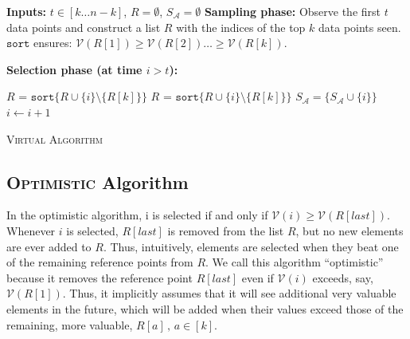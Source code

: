 \begin{algorithm}[ht]
\textbf{Inputs:} $t\in[k\dots n-k]$, $R = \emptyset$, $S_{\mathcal{A}} = \emptyset$
\newline
\textbf{Sampling phase:} Observe the first $t$ data points and construct a list $R$ with the indices of the top $k$ data points seen.  $\texttt{sort}$ ensures: $ \mathcal{V}(R[1]) \geq \mathcal{V}(R[2]) \dots \geq \mathcal{V}(R[k]).$

\textbf{Selection phase (at time $i>t$):}

\begin{algorithmic}[1]
        \STATE $R$ = $\texttt{sort}\{R \cup \{i\} \setminus \{R[k]\}\}$ \hfill{}
        \STATE $R$ = $\texttt{sort}\{R \cup \{i\} \setminus \{R[k]\}\}$ \hfill{}
        \STATE $S_\mathcal{A} = \{ S_\mathcal{A} \cup \{i \}\}$ \hfill{}
\ENDIF 
\STATE
$i\gets i + 1$
\end{algorithmic}
 \caption{\textsc{Virtual Algorithm}}
\end{algorithm}


\subsection{\textsc{Optimistic} Algorithm}

In the optimistic algorithm, i is selected if and only if $\mathcal{V}(i) \geq \mathcal{V}(R[last])$. Whenever $i$ is selected, $R[last]$
is removed from the list
$R$, but no new elements are ever added to $R$. Thus, intuitively, elements are selected when they beat one of the remaining reference
points from $R$.
We call this algorithm “optimistic” because it removes the reference
point $R[last]$ even if $ \mathcal{V}(i)$ exceeds, say, $ \mathcal{V}(R[1])$. Thus, it implicitly assumes
that it will see additional very valuable elements in the future, which
will be added when their values exceed those of the remaining, more
valuable, $R[a]\,,\,a \in [k]$.


